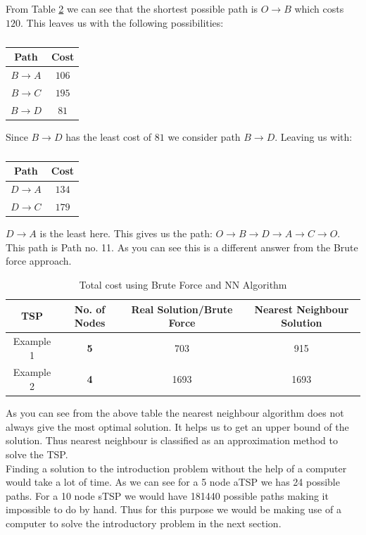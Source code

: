 \documentclass[a4paper]{article}
\begin{document}
From Table \ref{tab:path1Suchir} we can see that the shortest possible path is $O\to B$ which costs $120$. This leaves us with the following possibilities:
\begin{table}[H]
    \centering
    \begin{tabular}{|c|c|}
    \hline
    Path & Cost\\ 
    \hline
    $B\to A$ & $106$  \\
    $B\to C$ & $195$  \\
    $B\to D$ & $81$  \\
    \end{tabular}
    \caption{}
    \label{tab:path1Suchir}
\end{table}
Since $B\to D$ has the least cost of $81$ we consider path $B\to D$. Leaving us with:
\begin{table}[H]
    \centering
    \begin{tabular}{|c|c|}
    \hline
    Path & Cost\\ 
    \hline
    $D\to A$ & $134$  \\
    $D\to C$ & $179$  \\
    \end{tabular}
    \caption{}
    \label{tab:path1Suchir}
\end{table}
$D\to A$ is the least here. This gives us the path: $O\to B \to D \to A \to C \to O$. This path is Path no. 11. As you can see this is a different answer from the Brute force approach.
\begin{table}[h]
    \centering
    \begin{tabular}{|c|c|cc|}
    \hline
    TSP & No. of Nodes & Real Solution/Brute Force & Nearest Neighbour Solution \\ \hline
    Example 1      & \textbf{5}   & 703  & 915\\
    Example 2      & \textbf{4}   & 1693 & 1693\\
    \end{tabular}
    \caption{Total cost using Brute Force and NN Algorithm}
    \label{tab:eg1CostMatrix}
\end{table}
As you can see from the above table the nearest neighbour algorithm does not always give the most optimal solution. It helps us to get an upper bound of the solution. Thus nearest neighbour is classified as an approximation method to solve the TSP.\\
Finding a solution to the introduction problem without the help of a computer would take a lot of time. As we can see for a 5 node aTSP we has 24 possible paths. For a 10 node sTSP we would have 181440 possible paths making it impossible to do by hand. Thus for this purpose we would be making use of a computer to solve the introductory problem in the next section.
\end{document}
